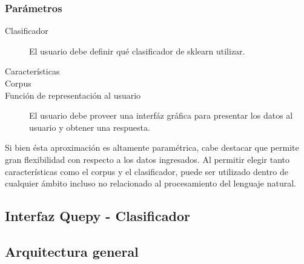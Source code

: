 \subsubsection{Parámetros}
\begin{description}
	\item[Clasificador] El usuario debe definir qué clasificador de sklearn utilizar.
	\item[Características]
	\item[Corpus]
	\item[Función de representación al usuario] El usuario debe proveer una interfáz gráfica para presentar los datos al usuario y obtener una respuesta.
\end{description}
Si bien ésta aproximación es altamente paramétrica, cabe destacar que permite gran flexibilidad con respecto a los datos ingresados. Al permitir elegir tanto características como el corpus y el clasificador, puede ser utilizado dentro de cualquier ámbito incluso no relacionado al procesamiento del lenguaje natural.

\subsection{Interfaz Quepy - Clasificador}

\subsection{Arquitectura general}


